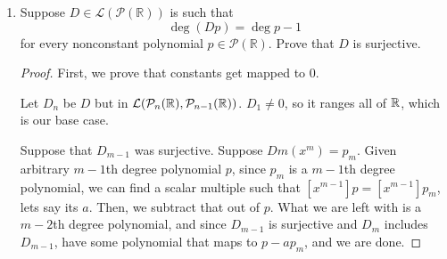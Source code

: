 \begin{enumerate}
    \item[28] Suppose $D \in \mathcal L(\mathcal P(\mathbb R))$ is such that
    \[\deg(Dp)=\deg p-1\]
    for every nonconstant polynomial $p\in\mathcal P(\mathbb R)$. Prove that $D$ is surjective.

    \begin{proof}
        First, we prove that constants get mapped to 0. 
        
        Let $D_n$ be $D$ but in $\mathcal L(\mathcal P_n(\mathbb{R}), \mathcal P_{n - 1}(\mathbb{R}))$. $D_1 \neq 0$, so it ranges all of $\mathbb{R}$, which is our base case.

        Suppose that $D_{m-1}$ was surjective. Suppose $D{m}(x^m) = p_m$. Given arbitrary $m-1$th degree polynomial $p$, since $p_m$ is a $m-1$th degree polynomial, we can find a scalar multiple such that $[x^{m-1}]p = [x^{m-1}]p_m$, lets say its $a$. Then, we subtract that out of $p$. What we are left with is a $m-2$th degree polynomial, and since $D_{m-1}$ is surjective and $D_{m}$ includes $D_{m-1}$, have some polynomial that maps to $p - ap_m$, and we are done.
    \end{proof}
\end{enumerate}